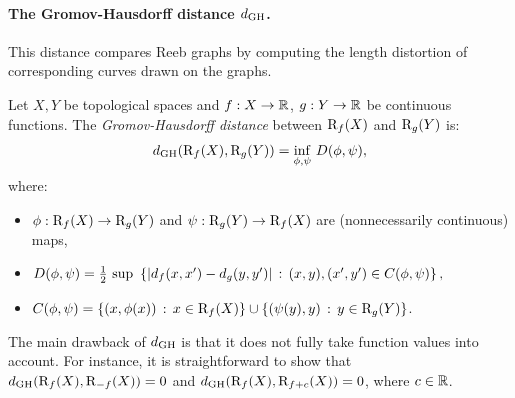 
\paragraph*{The Gromov-Hausdorff distance $d_{\rm GH}$.} This distance compares Reeb graphs by computing the length distortion 
of corresponding curves drawn on the graphs.
%
\begin{defin}\label{def:dgh}
Let $X,Y$ be topological spaces and $f:X\rightarrow\mathbb{R}$, $g:Y\rightarrow\mathbb{R}$ be continuous functions.
The {\em Gromov-Hausdorff distance} between $\mathrm{R}_f(X)$ and $\mathrm{R}_g(Y)$ is:
\begin{equation}\label{eq:dgh}
\distgh(\Reeb_f(X),\Reeb_g(Y))=\underset{\phi,\psi}{\rm inf}\ D(\phi,\psi),
\end{equation}
where: 
\begin{itemize}
\item $\phi:\mathrm{R}_f(X)\rightarrow\mathrm{R}_g(Y)$ and $\psi:\mathrm{R}_g(Y)\rightarrow\mathrm{R}_f(X)$ are (nonnecessarily continuous) maps, 
\item $D(\phi,\psi)=\frac 12\ {\rm sup}\ \left\{|d_f(x,x')-d_g(y,y')|\,:\,(x,y),(x',y')\in C(\phi,\psi)\right\},$ %
\item 
$C(\phi,\psi)=\{(x,\phi(x))\, :\, x\in\mathrm{R}_f(X)\}\cup\{(\psi(y),y)\, :\, y\in\mathrm{R}_g(Y)\}$.
\end{itemize}
\end{defin}
%
The main drawback of $d_{\rm GH}$ is that it does not fully take function values into account. For instance,
it is straightforward to show that $d_{\rm GH}(\mathrm{R}_f(X),\mathrm{R}_{-f}(X))=0$ and $d_{\rm GH}(\mathrm{R}_f(X),\mathrm{R}_{f+c}(X))=0$,
where $c\in\mathbb{R}$. %

